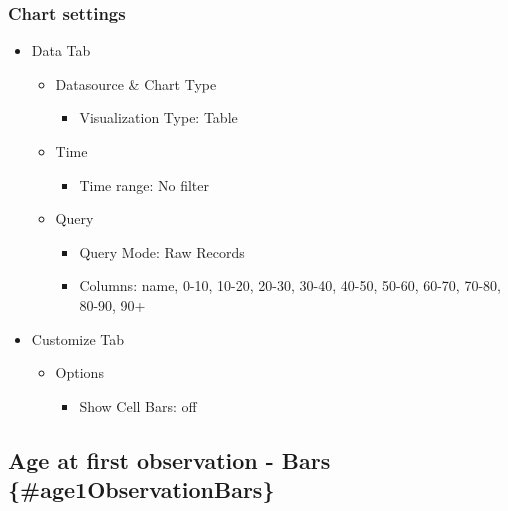 \documentclass[
]{book}
\providecommand{\tightlist}{%
  \setlength{\itemsep}{0pt}\setlength{\parskip}{0pt}}
\begin{document}
\hypertarget{chart-settings-17}{%
\subsubsection*{Chart settings}\label{chart-settings-17}}

\begin{itemize}
\tightlist
\item
  Data Tab

  \begin{itemize}
  \tightlist
  \item
    Datasource \& Chart Type

    \begin{itemize}
    \tightlist
    \item
      Visualization Type: Table
    \end{itemize}
  \item
    Time

    \begin{itemize}
    \tightlist
    \item
      Time range: No filter
    \end{itemize}
  \item
    Query

    \begin{itemize}
    \tightlist
    \item
      Query Mode: Raw Records
    \item
      Columns: name, 0-10, 10-20, 20-30, 30-40, 40-50, 50-60, 60-70, 70-80, 80-90, 90+
    \end{itemize}
  \end{itemize}
\item
  Customize Tab

  \begin{itemize}
  \tightlist
  \item
    Options

    \begin{itemize}
    \tightlist
    \item
      Show Cell Bars: off
    \end{itemize}
  \end{itemize}
\end{itemize}

\hypertarget{age-at-first-observation---bars-age1observationbars}{%
\subsection*{Age at first observation - Bars \{\#age1ObservationBars\}}\label{age-at-first-observation---bars-age1observationbars}}
\end{document}
